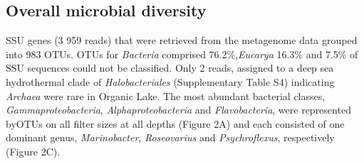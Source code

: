 \subsection{Overall microbial diversity}
\ac{SSU} genes (3 959 reads) that were retrieved from the metagenome data grouped into 983 \acp{OTU}. 
\acp{OTU} for \emph{Bacteria} comprised 76.2\%,\emph{Eucarya} 16.3\% and 7.5\% of \ac{SSU} sequences could not be classified. 
Only 2 reads, assigned to a deep sea hydrothermal clade of \emph{Halobacteriales} (Supplementary Table S4) indicating \emph{Archaea} were rare in Organic Lake. 
The most abundant bacterial classes, \emph{Gammaproteobacteria}, \emph{ \emph{Alphaproteobacteria}} and \emph{Flavobacteria}, were represented by\acp{OTU} on all filter sizes at all depths (Figure 2A) and each consisted of one dominant genus, \emph{Marinobacter}, \emph{Roseovarius} and \emph{Psychroflexus}, respectively (Figure 2C). 
